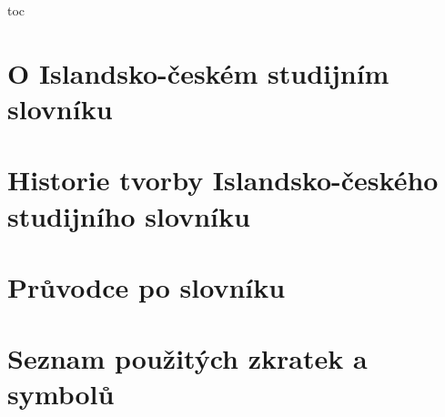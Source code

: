 
\cleardoublepage 

\pdfbookmark\contentsname{toc}    
\tableofcontents
\thispagestyle{empty}
\cleardoublepage 

\fi

\setcounter{page}{3}

\ifinputintroduction


\chapter{O Islandsko-českém studijním slovníku}



\chapter{Historie tvorby Islandsko-českého studijního slovníku}
\longchapterskip



\chapter{Průvodce po slovníku}
\begin{multicols}{2}

\end{multicols}


\chapter{Seznam použitých zkratek a symbolů}
\begin{multicols}{2}
\begin{description}[leftmargin=!,labelwidth=1.5cm]

\end{description}
\end{multicols}

